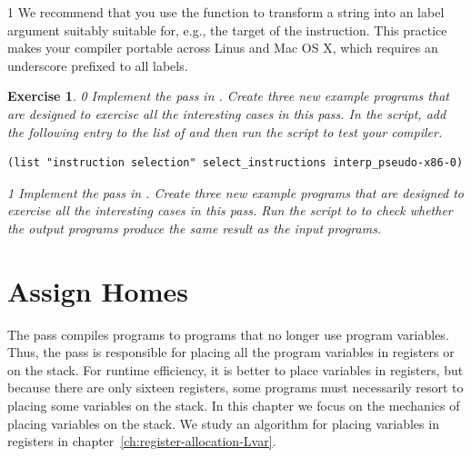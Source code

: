 \documentclass[7x10]{TimesAPriori_MIT}%
\def\racketEd{0}
\def\pythonEd{1}
\def\edition{0}
\newtheorem{exercise}[theorem]{Exercise}
\numberwithin{theorem}{chapter}
\numberwithin{definition}{chapter}
\numberwithin{equation}{chapter}
\begin{document}
{\if\edition\pythonEd
We recommend that you use the function  to
transform a string into an label argument suitably suitable for, e.g.,
the target of the  instruction. This practice makes your
compiler portable across Linus and Mac OS X, which requires an underscore prefixed to
all labels.
\fi}
\begin{exercise}
  \normalfont\normalsize
{\if\edition\racketEd
Implement the  pass in
. Create three new example programs that are
designed to exercise all the interesting cases in this pass.
%
In the  script, add the following entry to the
list of  and then run the script to test your compiler.
\begin{lstlisting}
(list "instruction selection" select_instructions interp_pseudo-x86-0)
\end{lstlisting}
\fi}
{\if\edition\pythonEd
Implement the  pass in
. Create three new example programs that are
designed to exercise all the interesting cases in this pass.
Run the  script to to check
whether the output programs produce the same result as the input
programs.
\fi}
\end{exercise}


\section{Assign Homes}
\label{sec:assign-Lvar}

The  pass compiles \LangXVar{} programs to
\LangXVar{} programs that no longer use program variables.  Thus, the
 pass is responsible for placing all the program
variables in registers or on the stack. For runtime efficiency, it is
better to place variables in registers, but because there are only
sixteen registers, some programs must necessarily resort to placing
some variables on the stack. In this chapter we focus on the mechanics
of placing variables on the stack. We study an algorithm for placing
variables in registers in chapter~\ref{ch:register-allocation-Lvar}.
\end{document}
